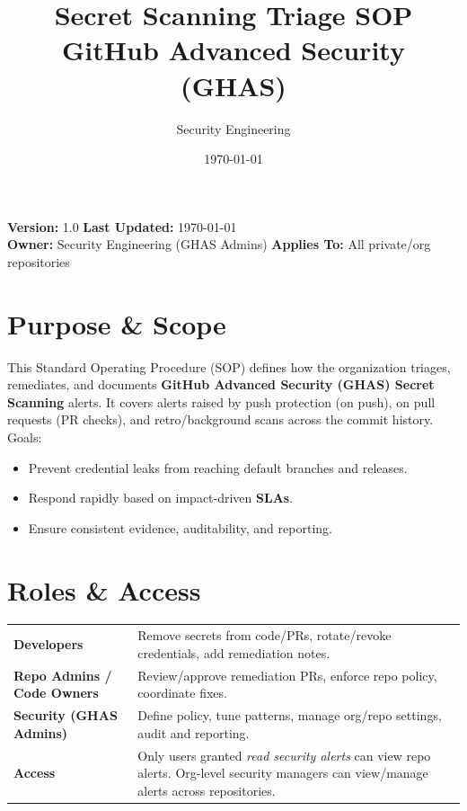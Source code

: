 \documentclass[11pt,a4paper]{article}
\title{\textbf{Secret Scanning Triage SOP}\\[2pt]\large GitHub Advanced Security (GHAS)}
\author{Security Engineering}
\date{\today}
\begin{document}
\maketitle
\begin{ghascallout}
\textbf{Version:} 1.0 \hfill \textbf{Last Updated:} \today\\
\textbf{Owner:} Security Engineering (GHAS Admins) \hfill \textbf{Applies To:} All private/org repositories
\end{ghascallout}

\tableofcontents
\bigskip

\section{Purpose \& Scope}
This Standard Operating Procedure (SOP) defines how the organization triages, remediates, and documents \textbf{GitHub Advanced Security (GHAS) Secret Scanning} alerts. It covers alerts raised by push protection (on push), on pull requests (PR checks), and retro/background scans across the commit history. Goals:
\begin{itemize}[nosep,leftmargin=1.2em]
  \item Prevent credential leaks from reaching default branches and releases.
  \item Respond rapidly based on impact-driven \textbf{SLAs}.
  \item Ensure consistent evidence, auditability, and reporting.
\end{itemize}

\section{Roles \& Access}
\begin{tabularx}{\linewidth}{>{\bfseries}l X}
\toprule
Developers & Remove secrets from code/PRs, rotate/revoke credentials, add remediation notes. \\
Repo Admins / Code Owners & Review/approve remediation PRs, enforce repo policy, coordinate fixes. \\
Security (GHAS Admins) & Define policy, tune patterns, manage org/repo settings, audit and reporting. \\
Access & Only users granted \emph{read security alerts} can view repo alerts. Org-level security managers can view/manage alerts across repositories. \\
\bottomrule
\end{tabularx}
\end{document}
